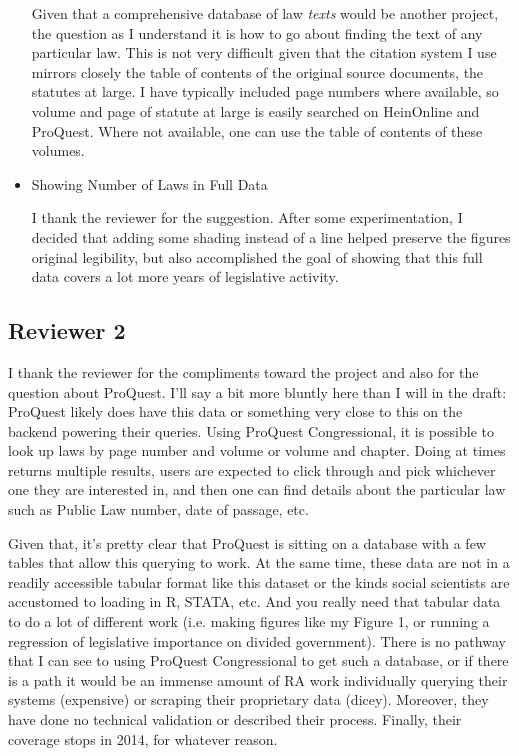 \documentclass{article}
\begin{document}
\begin{itemize}
Given that a comprehensive database of law \textit{texts} would be another project, the question as I understand it is how to go about finding the text of any particular law. This is not very difficult given that the citation system I use mirrors closely the table of contents of the original source documents, the statutes at large. I have typically included page numbers where available, so volume and page of statute at large is easily searched on HeinOnline and ProQuest. Where not available, one can use the table of contents of these volumes. 

\item Showing Number of Laws in Full Data

I thank the reviewer for the suggestion. After some experimentation, I decided that adding some shading instead of a line helped preserve the figures original legibility, but also accomplished the goal of showing that this full data covers a lot more years of legislative activity.

\end{itemize}


\subsection*{Reviewer 2}

I thank the reviewer for the compliments toward the project and also for the question about ProQuest. I'll say a bit more bluntly here than I will in the draft: ProQuest likely does have this data or something very close to this on the backend powering their queries. Using ProQuest Congressional, it is possible to look up laws by page number and volume or volume and chapter. Doing at times returns multiple results, users are expected to click through and pick whichever one they are interested in, and then one can find details about the particular law such as Public Law number, date of passage, etc. \newline

Given that, it's pretty clear that ProQuest is sitting on a database with a few tables that allow this querying to work. At the same time, these data are not in a readily accessible tabular format like this dataset or the kinds social scientists are accustomed to loading in R, STATA, etc. And you really need that tabular data to do a lot of different work (i.e. making figures like my Figure 1, or running a regression of legislative importance on divided government). There is no pathway that I can see to using ProQuest Congressional to get such a database, or if there is a path it would be an immense amount of RA work individually querying their systems (expensive) or scraping their proprietary data (dicey). Moreover, they have done no technical validation or described their process. Finally, their coverage stops in 2014, for whatever reason. \newline 
\end{document}
